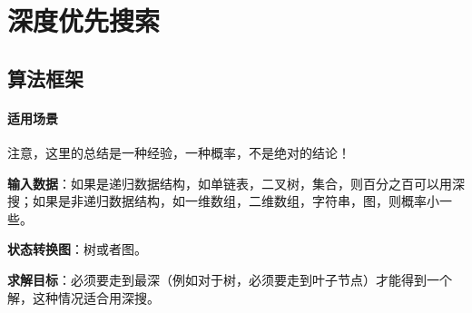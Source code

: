 \chapter{深度优先搜索}


\section{算法框架} %
\label{sec:dfs-template}


\subsubsection{适用场景}
注意，这里的总结是一种经验，一种概率，不是绝对的结论！

\textbf{输入数据}：如果是递归数据结构，如单链表，二叉树，集合，则百分之百可以用深搜；如果是非递归数据结构，如一维数组，二维数组，字符串，图，则概率小一些。

\textbf{状态转换图}：树或者图。

\textbf{求解目标}：必须要走到最深（例如对于树，必须要走到叶子节点）才能得到一个解，这种情况适合用深搜。


